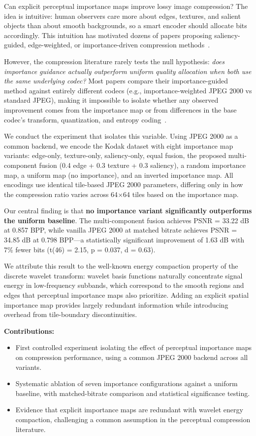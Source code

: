 \documentclass[conference]{IEEEtran}
\begin{document}
Can explicit perceptual importance maps improve lossy image compression?
The idea is intuitive: human observers care more about edges, textures, and
salient objects than about smooth backgrounds, so a smart encoder should
allocate bits accordingly. This intuition has motivated dozens of papers
proposing saliency-guided, edge-weighted, or importance-driven compression
methods~\cite{guo2010visual,wang2004image}.

However, the compression literature rarely tests the null hypothesis:
\textit{does importance guidance actually outperform uniform quality allocation
when both use the same underlying codec?} Most papers compare their
importance-guided method against entirely different codecs (e.g.,
importance-weighted JPEG 2000 vs standard JPEG), making it impossible to
isolate whether any observed improvement comes from the importance map or
from differences in the base codec's transform, quantization, and entropy
coding~\cite{taubman2002jpeg2000}.

We conduct the experiment that isolates this variable. Using JPEG 2000 as a
common backend, we encode the Kodak dataset with eight importance map variants:
edge-only, texture-only, saliency-only, equal fusion, the proposed multi-component
fusion (0.4 edge + 0.3 texture + 0.3 saliency), a random importance map, a
uniform map (no importance), and an inverted importance map. All encodings use
identical tile-based JPEG 2000 parameters, differing only in how the compression
ratio varies across 64$\times$64 tiles based on the importance map.

Our central finding is that \textbf{no importance variant significantly
outperforms the uniform baseline}. The multi-component fusion achieves
PSNR = 33.22 dB at 0.857 BPP, while vanilla JPEG 2000 at matched bitrate
achieves PSNR = 34.85 dB at 0.798 BPP---a statistically significant
improvement of 1.63 dB with 7\% fewer bits
(t(46) = 2.15, p = 0.037, d = 0.63).

We attribute this result to the well-known energy compaction property of the
discrete wavelet transform: wavelet basis functions naturally concentrate
signal energy in low-frequency subbands, which correspond to the smooth
regions and edges that perceptual importance maps also prioritize. Adding an
explicit spatial importance map provides largely redundant information while
introducing overhead from tile-boundary discontinuities.

\textbf{Contributions:}
\begin{itemize}
    \item First controlled experiment isolating the effect of perceptual
      importance maps on compression performance, using a common JPEG 2000
      backend across all variants.
    \item Systematic ablation of seven importance configurations against a
      uniform baseline, with matched-bitrate comparison and statistical
      significance testing.
    \item Evidence that explicit importance maps are redundant with wavelet
      energy compaction, challenging a common assumption in the perceptual
      compression literature.
\end{itemize}
\end{document}
